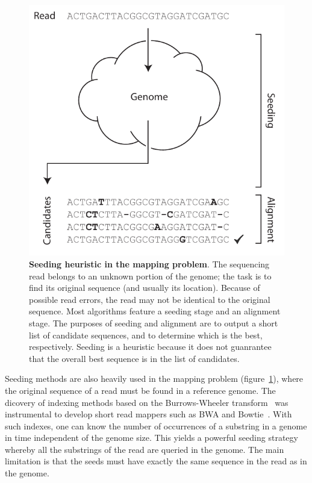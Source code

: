 \documentclass{article}
\begin{document}
\begin{figure}[h]
\centering
\includegraphics[scale=.8]{cloud_genome.pdf}
\caption{\textbf{Seeding heuristic in the mapping problem}. The sequencing
read belongs to an unknown portion of the genome; the task is to find its
original sequence (and usually its location). Because of possible read
errors, the read may not be identical to the original sequence. Most
algorithms feature a seeding stage and an alignment stage. The purposes of
seeding  and alignment are to output a short list of candidate sequences, 
and to determine which is the best, respectively. Seeding is a heuristic
because it does not guanrantee that the overall best sequence is in the
list of candidates.}
\label{fig:cloud_genome}
\end{figure}


Seeding methods are also heavily used in the mapping problem
(figure~\ref{fig:cloud_genome}), where the original sequence of a read
must be found in a reference genome. The dicovery of indexing methods
based on the Burrows-Wheeler
transform~\cite{Ferragina:2000:ODS:795666.796543} was instrumental to
develop short read mappers such as BWA and Bowtie~\cite{pmid19451168,
pmid19261174}. With such indexes, one can know the number of occurrences
of a substring in a genome in time independent of the genome size. This
yields a powerful seeding strategy whereby all the substrings of the read
are queried in the genome. The main limitation is that the seeds must have
exactly the same sequence in the read as in the genome.
\end{document}
